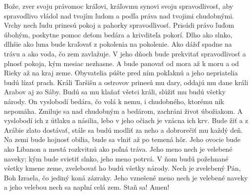 Bože, zver svoju právomoc kráľovi,
kráľovmu synovi svoju spravodlivosť,
\versseparator
aby spravodlivo vládol nad tvojím ľudom
a podľa práva nad tvojimi chudobnými.
\versseparator
Vrchy nech ľudu prinesú pokoj
a pahorky spravodlivosť.
\versseparator
Prisúdi právo ľuďom úbohým,
poskytne pomoc deťom bedára
a krivditeľa pokorí.
\versseparator
Dlho ako slnko, dlhšie ako luna bude kraľovať
z pokolenia na pokolenie.
\versseparator
Ako dážď spadne na trávu
a ako voda, čo zem zavlažuje.
\versseparator
V jeho dňoch bude prekvitať spravodlivosť a plnosť pokoja,
kým mesiac nezhasne.
\versseparator
A bude panovať od mora až k moru
a od Rieky až na kraj zeme.
\versseparator
Obyvatelia púšte pred ním pokľaknú
a jeho nepriatelia budú lízať prach.
\versseparator
Králi Taršišu a ostrovov prinesú mu dary,
oddajú mu dane králi Arabov aj zo Sáby.
\versseparator
Budú sa mu klaňať všetci králi,
slúžiť mu budú všetky národy.
\versseparator
On vyslobodí bedára, čo volá k nemu,
i chudobného, ktorému nik nepomáha.
\versseparator
Zmiluje sa nad chudobným a bedárom,
zachráni život úbožiakom.
\versseparator
A vyslobodí ich z útlaku a násilia,
lebo v jeho očiach je vzácna ich krv.
\versseparator
Bude žiť a z Arábie zlato dostávať,
stále sa budú modliť za neho
a dobrorečiť mu každý deň.
\versseparator
Na zemi bude hojnosť obilia,
bude sa vlniť až po temená hôr.
Jeho ovocie bude ako Libanon
a mestá rozkvitnú ako poľná tráva.
\versseparator
Jeho meno nech je velebené naveky;
kým bude svietiť slnko, jeho meno potrvá.
\versseparator
V ňom budú požehnané všetky kmene zeme,
zvelebovať ho budú všetky národy.
\versseparator
Nech je zvelebený Pán, Boh Izraela,
čo jediný koná zázraky.
\versseparator
Jeho vznešené meno nech je velebené naveky
a jeho velebou nech sa naplní celá zem. Staň sa! Amen!